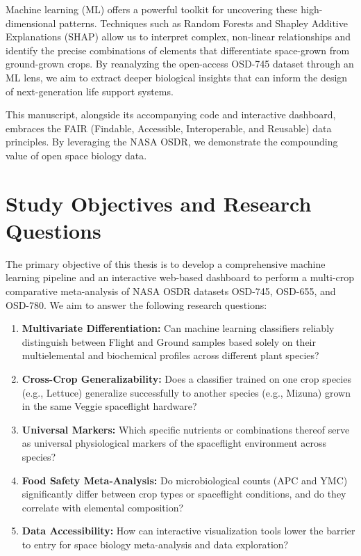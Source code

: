 Machine learning (ML) offers a powerful toolkit for uncovering these high-dimensional patterns. Techniques such as Random Forests \cite{breiman2001} and Shapley Additive Explanations (SHAP) \cite{lundberg2017} allow us to interpret complex, non-linear relationships and identify the precise combinations of elements that differentiate space-grown from ground-grown crops. By reanalyzing the open-access OSD-745 dataset through an ML lens, we aim to extract deeper biological insights that can inform the design of next-generation life support systems.

\begin{cosealert}
This manuscript, alongside its accompanying code and interactive dashboard, embraces the FAIR (Findable, Accessible, Interoperable, and Reusable) data principles. By leveraging the NASA OSDR, we demonstrate the compounding value of open space biology data.
\end{cosealert}

\section{Study Objectives and Research Questions}
The primary objective of this thesis is to develop a comprehensive machine learning pipeline and an interactive web-based dashboard to perform a multi-crop comparative meta-analysis of NASA OSDR datasets OSD-745, OSD-655, and OSD-780. We aim to answer the following research questions:
\begin{enumerate}
    \item \textbf{Multivariate Differentiation:} Can machine learning classifiers reliably distinguish between Flight and Ground samples based solely on their multielemental and biochemical profiles across different plant species?
    \item \textbf{Cross-Crop Generalizability:} Does a classifier trained on one crop species (e.g., Lettuce) generalize successfully to another species (e.g., Mizuna) grown in the same Veggie spaceflight hardware?
    \item \textbf{Universal Markers:} Which specific nutrients or combinations thereof serve as universal physiological markers of the spaceflight environment across species?
    \item \textbf{Food Safety Meta-Analysis:} Do microbiological counts (APC and YMC) significantly differ between crop types or spaceflight conditions, and do they correlate with elemental composition?
    \item \textbf{Data Accessibility:} How can interactive visualization tools lower the barrier to entry for space biology meta-analysis and data exploration?
\end{enumerate}
